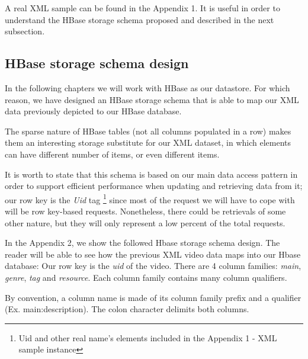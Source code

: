 \bigskip

A real XML sample can be found in the Appendix 1. It is useful in order to understand the HBase storage schema proposed and described in the next subsection.

\subsection{HBase storage schema design}

In the following chapters we will work with HBase as our datastore. For which reason, we have designed an HBase storage schema that is able to map our XML data previously depicted to our HBase database. 

\par
The sparse nature of HBase tables (not all columns populated in a row) makes them an interesting storage substitute for our XML dataset, in which elements can have different number of items, or even different items.

\par
It is worth to state that this schema is based on our main data access pattern in order to support efficient performance when updating and retrieving data from it; our row key is the \textit{Uid} tag \footnote{Uid and other real name's elements included in the Appendix 1 -  XML sample instance} since most of the request we will have to cope with will be row key-based requests. Nonetheless, there could be retrievals of some other nature, but they will only represent a low percent of the total requests.
\bigskip

In the Appendix 2, we show the followed Hbase storage schema design. The reader will be able to see how the previous XML video data maps into our Hbase database: Our row key is the \textit{uid} of the video. There are 4 column families: \textit{main}, \textit{genre}, \textit{tag} and \textit{resource}. Each column family contains many column qualifiers.
\par
By convention, a column name is made of its column family prefix and a qualifier (Ex. main:description). The colon character delimits both columns.



